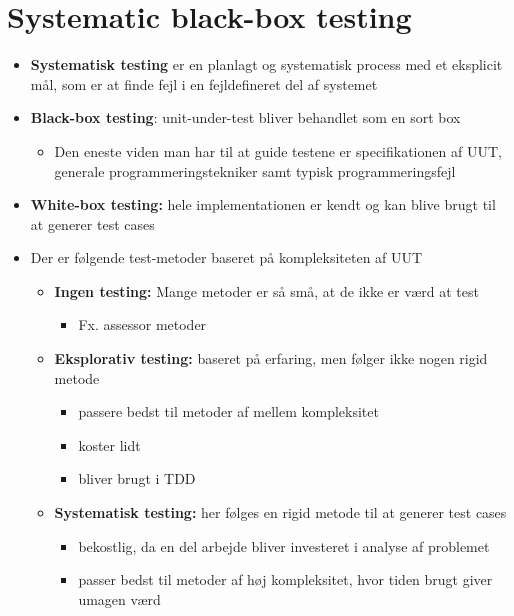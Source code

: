 \documentclass[a4, english]{article}
\begin{document}
\section{Systematic black-box testing}
\begin{itemize}
  \item \textbf{Systematisk testing} er en planlagt og systematisk process med et eksplicit mål, som er at finde fejl i en fejldefineret del af systemet 
  \item \textbf{Black-box testing}: unit-under-test bliver behandlet som en sort box
  \begin{itemize}
    \item Den eneste viden man har til at guide testene er specifikationen af UUT, generale  programmeringstekniker samt typisk programmeringsfejl  
  \end{itemize}
  \item \textbf{White-box testing:} hele implementationen er kendt og kan blive brugt til at generer test cases
  \item Der er følgende test-metoder baseret på kompleksiteten af UUT
  \begin{itemize}
    \item \textbf{Ingen testing:} Mange metoder er så små, at de ikke er værd at test
    \begin{itemize}
      \item Fx. assessor metoder
    \end{itemize}
    \item \textbf{Eksplorativ testing:} baseret på erfaring, men følger ikke nogen rigid metode 
    \begin{itemize}
      \item passere bedst til metoder af mellem kompleksitet 
      \item koster lidt 
      \item bliver brugt i TDD
    \end{itemize}
    \item \textbf{Systematisk testing:} her følges en rigid metode til at generer test cases
    \begin{itemize} 
      \item bekostlig, da en del arbejde bliver investeret i analyse af problemet
      \item passer bedst til metoder af høj kompleksitet, hvor tiden brugt giver umagen værd
    \end{itemize}
  \end{itemize} 
\end{itemize}
\end{document}
